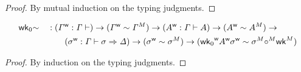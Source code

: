\begin{proof}
By mutual induction on the typing judgments.
\end{proof}

\begin{lemma}
\begin{alignat*}{5}
  & \mathsf{wk}_0{\sim} && :
  ({\mathit{\Gamma}}^{\mathsf{w}} : \mathit{\Gamma} \vdash) \rightarrow
  ({\mathit{\Gamma}}^{\mathsf{w}} \sim {\mathit{\Gamma}}^M) \rightarrow
  ({A}^{\mathsf{w}} : \mathit{\Gamma} \vdash A) \rightarrow
  ({A}^{\mathsf{w}} \sim {A}^M) \rightarrow
  \\
  &&& \qquad
  ({\sigma}^{\mathsf{w}} : \mathit{\Gamma}\vdash \sigma \Rightarrow \mathit{\Delta}) \rightarrow
  ({\sigma}^{\mathsf{w}} \sim {\sigma}^M) \rightarrow
  ({\mathsf{wk}_0}^{\mathsf{w}}{A}^{\mathsf{w}}{\sigma}^{\mathsf{w}} \sim {\sigma}^M{\circ}^M{\mathsf{wk}}^M)
  \end{alignat*}
\end{lemma}
\begin{proof}
By induction on the typing judgments.
\end{proof}




